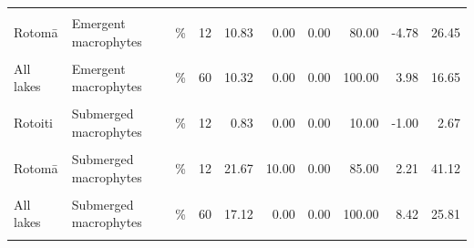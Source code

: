 \documentclass[
  12pt,
  a4paper,
  oneside]{scrbook}
\begin{document}
\begin{longtable}[t]{lllrrrrrrr}
\cellcolor{gray!8}{Rotoehu} & \cellcolor{gray!8}{Emergent macrophytes} & \cellcolor{gray!8}{\%} & \cellcolor{gray!8}{12} & \cellcolor{gray!8}{8.75} & \cellcolor{gray!8}{0.00} & \cellcolor{gray!8}{0.00} & \cellcolor{gray!8}{35.00} & \cellcolor{gray!8}{-0.74} & \cellcolor{gray!8}{18.24}\\
Rotomā & Emergent macrophytes & \% & 12 & 10.83 & 0.00 & 0.00 & 80.00 & -4.78 & 26.45\\
\cellcolor{gray!8}{Ōkāreka} & \cellcolor{gray!8}{Emergent macrophytes} & \cellcolor{gray!8}{\%} & \cellcolor{gray!8}{12} & \cellcolor{gray!8}{22.50} & \cellcolor{gray!8}{0.00} & \cellcolor{gray!8}{0.00} & \cellcolor{gray!8}{90.00} & \cellcolor{gray!8}{-0.35} & \cellcolor{gray!8}{45.35}\\
\addlinespace
All lakes & Emergent macrophytes & \% & 60 & 10.32 & 0.00 & 0.00 & 100.00 & 3.98 & 16.65\\
\cellcolor{gray!8}{Rotorua} & \cellcolor{gray!8}{Submerged macrophytes} & \cellcolor{gray!8}{\%} & \cellcolor{gray!8}{12} & \cellcolor{gray!8}{0.83} & \cellcolor{gray!8}{0.00} & \cellcolor{gray!8}{0.00} & \cellcolor{gray!8}{10.00} & \cellcolor{gray!8}{-1.00} & \cellcolor{gray!8}{2.67}\\
Rotoiti & Submerged macrophytes & \% & 12 & 0.83 & 0.00 & 0.00 & 10.00 & -1.00 & 2.67\\
\cellcolor{gray!8}{Rotoehu} & \cellcolor{gray!8}{Submerged macrophytes} & \cellcolor{gray!8}{\%} & \cellcolor{gray!8}{12} & \cellcolor{gray!8}{51.42} & \cellcolor{gray!8}{52.50} & \cellcolor{gray!8}{0.00} & \cellcolor{gray!8}{100.00} & \cellcolor{gray!8}{20.51} & \cellcolor{gray!8}{82.33}\\
Rotomā & Submerged macrophytes & \% & 12 & 21.67 & 10.00 & 0.00 & 85.00 & 2.21 & 41.12\\
\addlinespace
\cellcolor{gray!8}{Ōkāreka} & \cellcolor{gray!8}{Submerged macrophytes} & \cellcolor{gray!8}{\%} & \cellcolor{gray!8}{12} & \cellcolor{gray!8}{10.83} & \cellcolor{gray!8}{0.00} & \cellcolor{gray!8}{0.00} & \cellcolor{gray!8}{100.00} & \cellcolor{gray!8}{-7.43} & \cellcolor{gray!8}{29.10}\\
All lakes & Submerged macrophytes & \% & 60 & 17.12 & 0.00 & 0.00 & 100.00 & 8.42 & 25.81\\
\cellcolor{gray!8}{Rotorua} & \cellcolor{gray!8}{Temperature} & \cellcolor{gray!8}{Degree C} & \cellcolor{gray!8}{12} & \cellcolor{gray!8}{23.15} & \cellcolor{gray!8}{23.25} & \cellcolor{gray!8}{21.80} & \cellcolor{gray!8}{25.30} & \cellcolor{gray!8}{22.52} & \cellcolor{gray!8}{23.78}\\

\end{longtable}
\end{document}
